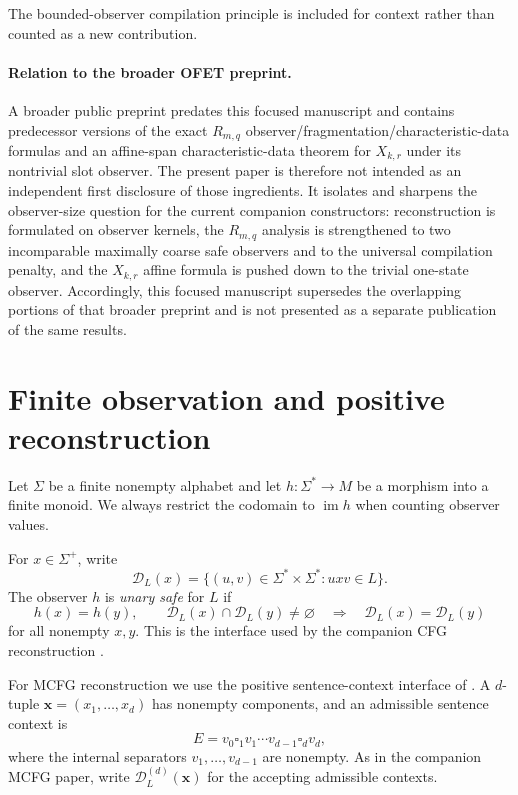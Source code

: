 \documentclass[11pt]{article}
\theoremstyle{definition}
\theoremstyle{remark}
\newcommand{\D}{\mathcal D}
\newcommand{\im}{\operatorname{im}}
\newcommand{\blank}{\square}
\begin{document}
The bounded-observer compilation principle is included for context rather than
counted as a new contribution.

\paragraph{Relation to the broader OFET preprint.}
A broader public preprint \cite{KuriyamaOFET} predates this focused manuscript
and contains predecessor versions of the exact \(R_{m,q}\)
observer/fragmentation/characteristic-data formulas and an affine-span
characteristic-data theorem for \(X_{k,r}\) under its nontrivial slot
observer.  The present paper is therefore not intended as an independent
first disclosure of those ingredients.  It isolates and sharpens the
observer-size question for the current companion constructors: reconstruction
is formulated on observer kernels, the \(R_{m,q}\) analysis is strengthened
to two incomparable maximally coarse safe observers and to the universal
compilation penalty, and the \(X_{k,r}\) affine formula is pushed down to the
trivial one-state observer.  Accordingly, this focused manuscript supersedes the overlapping portions of
that broader preprint and is not presented as a separate publication of the
same results.
\section{Finite observation and positive reconstruction}
\label{sec:setup}

Let \(\Sigma\) be a finite nonempty alphabet and let
\(h:\Sigma^*\to M\) be a morphism into a finite monoid.  We always restrict
the codomain to \(\im h\) when counting observer values.

For \(x\in\Sigma^+\), write
\[
 \D_L(x)=\{(u,v)\in\Sigma^*\times\Sigma^*:uxv\in L\}.
\]
The observer \(h\) is \emph{unary safe} for \(L\) if
\[
 h(x)=h(y),\qquad
 \D_L(x)\cap\D_L(y)\ne\varnothing
 \quad\Longrightarrow\quad
 \D_L(x)=\D_L(y)
\]
for all nonempty \(x,y\).  This is the interface used by the companion CFG
reconstruction \cite{KuriyamaCFG}.

For MCFG reconstruction we use the positive sentence-context interface of
\cite{KuriyamaMCFG}.  A \(d\)-tuple
\(\mathbf x=(x_1,\ldots,x_d)\) has nonempty components, and an admissible
sentence context is
\[
 E=v_0\blank_1v_1\cdots v_{d-1}\blank_dv_d,
\]
where the internal separators \(v_1,\ldots,v_{d-1}\) are nonempty.  As in the
companion MCFG paper, write \(\D_L^{(d)}(\mathbf x)\) for the accepting
admissible contexts.
\end{document}
